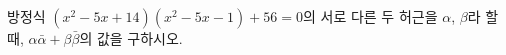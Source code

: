 방정식 $(x^2-5x+14)(x^2-5x-1)+56=0$의 서로 다른 두 허근을 $\alpha$, $\beta$라 할 때, $\alpha\bar{\alpha}+\beta\bar{\beta}$의 값을 구하시오. 

